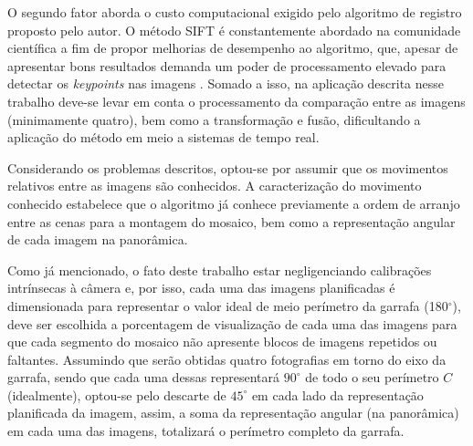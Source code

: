 O segundo fator aborda o custo computacional exigido pelo algoritmo de registro proposto pelo autor. O método SIFT é constantemente abordado na comunidade científica a fim de propor melhorias de desempenho ao algoritmo, que, apesar de apresentar bons resultados demanda um poder de processamento elevado para detectar os \textit{keypoints} nas imagens \cite{Suzuki:2012}. Somado a isso, na aplicação descrita nesse trabalho deve-se levar em conta o processamento da comparação entre as imagens (minimamente quatro), bem como a transformação e fusão, dificultando a aplicação do método em meio a sistemas de tempo real.

Considerando os problemas descritos, %
optou-se por assumir que os movimentos relativos entre as imagens são conhecidos. 
A caracterização do movimento conhecido estabelece que o algoritmo já conhece previamente a ordem de arranjo entre as cenas para a montagem do mosaico, bem como a representação angular de cada imagem na panorâmica.

Como já mencionado, o fato deste trabalho estar negligenciando calibrações intrínsecas à câmera e, por isso, cada uma das imagens  planificadas é dimensionada para representar o valor ideal de meio perímetro da garrafa (180$^\circ$), deve ser escolhida a porcentagem de visualização de cada uma das imagens para que cada segmento do mosaico não apresente blocos de imagens repetidos ou faltantes. Assumindo que serão obtidas quatro fotografias em torno do eixo da garrafa, sendo que cada uma dessas representará $90^{\circ}$ de todo o seu perímetro $C$ (idealmente), optou-se pelo descarte de $45^{\circ}$ em cada lado da representação planificada da imagem, assim, a soma da representação angular (na panorâmica) em cada uma das imagens, totalizará o perímetro completo da garrafa.


